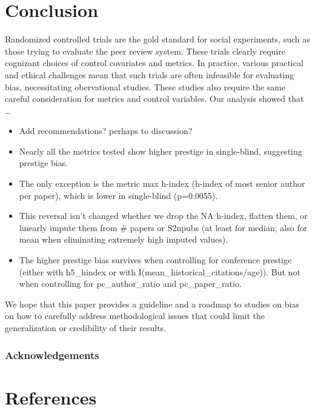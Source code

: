 \documentclass[12pt]{article}
\providecommand{\tightlist}{%
  \setlength{\itemsep}{0pt}\setlength{\parskip}{0pt}}
\begin{document}
\hypertarget{sec:conclusion}{%
\section{Conclusion}\label{sec:conclusion}}

Randomized controlled trials are the gold standard for social experiments, such as those trying to evaluate the peer review system.
These trials clearly require cognizant choices of control covariates and metrics.
In practice, various practical and ethical challenges mean that such trials are often infeasible for evaluating bias, necessitating obervational studies.
These studies also require the same careful consideration for metrics and control variables.
Our analysis showed that \ldots{}

\begin{itemize}
\tightlist
\item
  Add recommendations? perhaps to discussion?
\item
  Nearly all the metrics tested show higher prestige in single-blind, suggesting prestige bias.
\item
  The only exception is the metric max h-index (h-index of most senior author per paper), which is lower in single-blind (p=0.0055).
\item
  This reversal isn't changed whether we drop the NA h-index, flatten them, or linearly impute them from \# papers or S2npubs (at least for median; also for mean when eliminating extremely high imputed values).
\item
  The higher prestige bias survives when controlling for conference prestige (either with h5\_hindex or with I(mean\_historical\_citations/age)). But not when controlling for pc\_author\_ratio and pc\_paper\_ratio.
\end{itemize}

We hope that this paper provides a guideline and a roadmap to studies on bias on how to carefully address methodological issues that could limit the generalization or credibility of their results.

\hypertarget{acknowledgements}{%
\subsubsection*{Acknowledgements}\label{acknowledgements}}

\hypertarget{references}{%
\section*{References}\label{references}}
\end{document}
